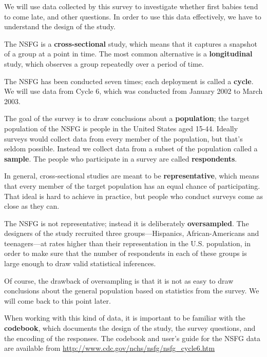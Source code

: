 \documentclass[12pt]{book}
\theoremstyle{exercise}
\begin{document}
We will use data collected by this survey to investigate whether first
babies tend to come late, and other questions.  In order to use this
data effectively, we have to understand the design of the study.

The NSFG is a {\bf cross-sectional} study, which means that it
captures a snapshot of a group at a point in time.  The most
common alternative is a {\bf longitudinal} study, which observes a
group repeatedly over a period of time.%
%
%
%

The NSFG has been conducted seven times; each deployment is called a
{\bf cycle}.  We will use data from Cycle 6, which was conducted from
January 2002 to March 2003.%

The goal of the survey is to draw conclusions about a {\bf
  population}; the target population of the NSFG is people in the
United States aged 15-44.  Ideally surveys would collect data from
every member of the population, but that's seldom possible.  Instead
we collect data from a subset of the population called a {\bf sample}.
The people who participate in a survey are called {\bf respondents}.%

In general,
cross-sectional studies are meant to be {\bf representative}, which
means that every member of the target population has an equal chance
of participating.  That ideal is hard to achieve in
practice, but people who conduct surveys come as close as they can.%
%

The NSFG is not representative; instead it is deliberately {\bf
  oversampled}.  The designers of the study recruited three
groups---Hispanics, African-Americans and teenagers---at rates higher
than their representation in the U.S. population, in order to
make sure that the number of respondents in each of
these groups is large enough to draw valid statistical inferences.%

Of course, the drawback of oversampling is that it is not as easy
to draw conclusions about the general population based on statistics
from the survey.  We will come back to this point later.

When working with this kind of data, it is important to be familiar
with the {\bf codebook}, which documents the design of the study, the
survey questions, and the encoding of the responses.  The codebook and
user's guide for the NSFG data are available from
\url{http://www.cdc.gov/nchs/nsfg/nsfg_cycle6.htm}
\end{document}
